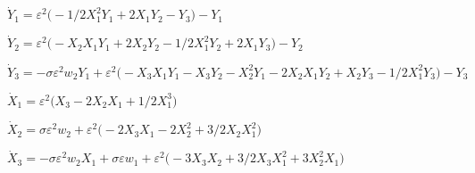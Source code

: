 \documentclass[11pt,a5paper]{article}
\def\eps{\varepsilon}
\begin{document}
\begin{math}
\dot Y_{1}=\eps^{2} \big(-1/2 X_{1}^{2} Y_{1}+2 X_{1} Y_{2}-Y_{3}\big)-Y
_{1}
\end{math}\par

\begin{math}
\dot Y_{2}=\eps^{2} \big(-X_{2} X_{1} Y_{1}+2 X_{2} Y_{2}-1/2 X_{1}^{2} 
Y_{2}+2 X_{1} Y_{3}\big)-Y_{2}
\end{math}\par

\begin{math}
\dot Y_{3}=-\sigma  \eps^{2} w_{2} Y_{1}+\eps^{2} \big(-X_{3} X_{1} Y_{1
}-X_{3} Y_{2}-X_{2}^{2} Y_{1}-2 X_{2} X_{1} Y_{2}+X_{2} Y_{3}-1/2 X_{1}
^{2} Y_{3}\big)-Y_{3}
\end{math}\par

\begin{math}
\dot X_{1}=\eps^{2} \big(X_{3}-2 X_{2} X_{1}+1/2 X_{1}^{3}\big)
\end{math}\par

\begin{math}
\dot X_{2}=\sigma  \eps^{2} w_{2}+\eps^{2} \big(-2 X_{3} X_{1}-2 X_{2}^{
2}+3/2 X_{2} X_{1}^{2}\big)
\end{math}\par

\begin{math}
\dot X_{3}=-\sigma  \eps^{2} w_{2} X_{1}+\sigma  \eps w_{1}+\eps^{2} 
\big(-3 X_{3} X_{2}+3/2 X_{3} X_{1}^{2}+3 X_{2}^{2} X_{1}\big)
\end{math}\par
\end{document}
